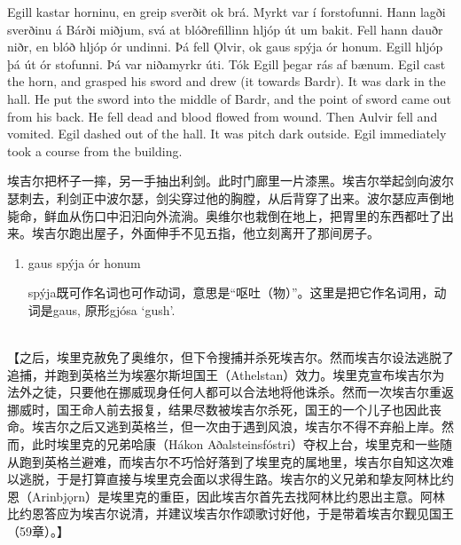 \begin{paracol}{2}
    Egill kastar horninu, en greip sverðit ok brá. Myrkt var í forstofunni. Hann lagði sverðinu á Bárði miðjum, svá at blóðrefillinn hljóp út um bakit. Fell hann dauðr niðr, en blóð hljóp ór undinni. Þá fell Ǫlvir, ok gaus spýja ór honum. Egill hljóp þá út ór stofunni. Þá var niðamyrkr úti. Tók Egill þegar rás af bænum.
    \switchcolumn
    Egil cast the horn, and grasped his sword and drew (it towards Bardr). It was dark in the hall. He put the sword into the middle of Bardr, and the point of sword came out from his back. He fell dead and blood flowed from wound. Then Aulvir fell and vomited. Egil dashed out of the hall. It was pitch dark outside. Egil immediately took a course from the building.
\end{paracol}
\begin{translation*}{}
    埃吉尔把杯子一摔，另一手抽出利剑。此时门廊里一片漆黑。埃吉尔举起剑向波尔瑟刺去，利剑正中波尔瑟，剑尖穿过他的胸膛，从后背穿了出来。波尔瑟应声倒地毙命，鲜血从伤口中汩汩向外流淌。奥维尔也栽倒在地上，把胃里的东西都吐了出来。埃吉尔跑出屋子，外面伸手不见五指，他立刻离开了那间房子。
\end{translation*}
\begin{grammar*}{}
    \begin{enumerate}[leftmargin=*]
        \item gaus spýja ór honum

              spýja既可作名词也可作动词，意思是“呕吐（物）”。这里是把它作名词用，动词是gaus, 原形gjósa `gush'.
    \end{enumerate}
\end{grammar*}
\hspace*{\fill}\\
【之后，埃里克赦免了奥维尔，但下令搜捕并杀死埃吉尔。然而埃吉尔设法逃脱了追捕，并跑到英格兰为埃塞尔斯坦国王（Athelstan）效力。埃里克宣布埃吉尔为法外之徒，只要他在挪威现身任何人都可以合法地将他诛杀。然而一次埃吉尔重返挪威时，国王命人前去报复，结果尽数被埃吉尔杀死，国王的一个儿子也因此丧命。埃吉尔之后又逃到英格兰，但一次由于遇到风浪，埃吉尔不得不弃船上岸。然而，此时埃里克的兄弟哈康（Hákon Aðalsteinsfóstri）夺权上台，埃里克和一些随从跑到英格兰避难，而埃吉尔不巧恰好落到了埃里克的属地里，埃吉尔自知这次难以逃脱，于是打算直接与埃里克会面以求得生路。埃吉尔的义兄弟和挚友阿林比约恩（Arinbjǫrn）是埃里克的重臣，因此埃吉尔首先去找阿林比约恩出主意。阿林比约恩答应为埃吉尔说清，并建议埃吉尔作颂歌讨好他，于是带着埃吉尔觐见国王（59章）。】
\hspace*{\fill}\\
